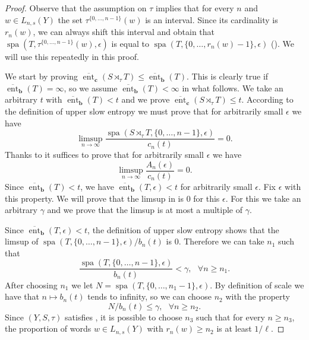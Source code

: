 \documentclass[a4paper,oneside]{amsart}
\renewcommand{\(}{\begin{dmath*}}
\renewcommand{\)}{\end{dmath*}}
\theoremstyle{definition}
\newcommand{\upperent}{\overline{\operatorname{ent}}}
\newcommand{\spa}{\operatorname{spa}}
\begin{document}
\begin{proof}
Observe that the assumption on $\tau$ implies that for every $n$ and $w\in L_{n,s}(Y)$ the set $\tau^{\{0,\dots,n-1\}}(w)$ is an interval. Since its cardinality is $r_n(w)$, we can always shift this interval and obtain that $\spa(T,\tau^{\{0,\dots,n-1\}}(w),\epsilon)$ is equal to $\spa(T,\{0,\dots,r_n(w)-1\},\epsilon)$ (). We will use this repeatedly in this proof. 

We start by proving $\upperent_{\textbf{c}}(S\rtimes_\tau T)\leq \upperent_{\textbf{b}}(T)$. This is clearly true if $\upperent_{\textbf{b}}(T)=\infty$, so we assume $\upperent_{\textbf{b}}(T)<\infty$ in what follows. We take an arbitrary $t$ with $\upperent_{\textbf{b}}(T)<t$ and we prove $\upperent_{\textbf{c}}(S\rtimes_\tau T)\leq t$. According to the definition of upper slow entropy we must prove that for arbitrarily small $\epsilon$ we have
\[\limsup_{n\to\infty} \frac{\spa(S\rtimes_\tau T,\{0,\dots,n-1\},\epsilon)}{c_n(t)}=0.\]
Thanks to  it suffices to prove that for arbitrarily small $\epsilon$ we have
\begin{equation}\label{limsup-slow}
    \limsup_{n\to\infty} \frac{A_n(\epsilon)}{c_n(t)}=0.
\end{equation}
Since $\upperent_{\textbf{b}}(T)<t$, we have $\upperent_{\textbf{b}}(T,\epsilon)<t$ for arbitrarily small $\epsilon$. Fix $\epsilon$ with this property. We will prove that the limsup in  is 0 for this $\epsilon$. For this we take an arbitrary $\gamma$ and we prove that the limsup is at most a multiple of $\gamma$. 

Since $\upperent_{\textbf{b}}(T,\epsilon)<t$, the definition of upper slow entropy shows that the limsup of $\spa(T,\{0,\dots,n-1\},\epsilon)/b_n(t)$ is $0$.  Therefore we can take $n_1$ such that 
\begin{equation}\label{n_1-slow}
    \frac{\spa(T,\{0,\dots,n-1\},\epsilon)}{b_n(t)}<\gamma, \ \ \ \forall n\geq n_1.
\end{equation}
After choosing $n_1$ we let $N=\spa(T,\{0,\dots,n_1-1\},\epsilon)$. By definition of scale we have that $n\mapsto b_n(t)$ tends to infinity, so we can choose $n_2$ with the property 
\begin{equation}\label{n_2-slow}N/b_n(t)\leq \gamma, \ \ \ \forall n\geq n_2.\end{equation}
Since $(Y,S,\tau)$ satisfies , it is possible to choose $n_3$ such that for every $n\geq n_3$, the proportion of words $w\in L_{n,s}(Y)$ with $r_n(w)\geq n_2$ is at least $1/\ell$. 


\end{proof}
\end{document}
